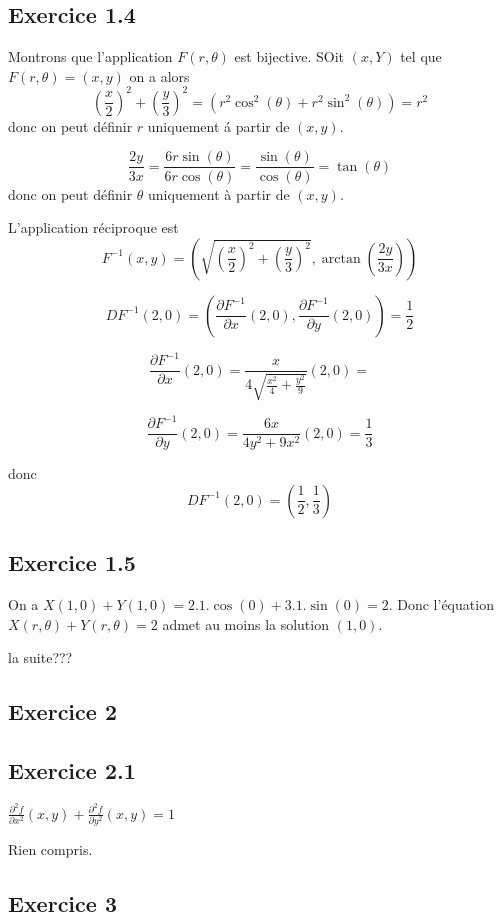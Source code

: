 \documentclass[]{book}
\theoremstyle{definition}
\begin{document}
\subsection*{Exercice 1.4}

Montrons que l'application $F(r,\theta)$ est bijective. SOit $(x,Y)$ tel que $F(r,\theta) = (x,y)$ on a alors 
$$
\left(\frac{x}{2}\right)^2+\left(\frac{y}{3}\right)^2 = (r^2\cos^2(\theta) + r^2\sin^2(\theta)) = r^2 
$$
donc on peut d\'efinir $r$ uniquement \'a partir de $(x,y)$. 


$$
\frac{2y}{3x} = \frac{6r\sin(\theta)}{6r\cos(\theta)} = \frac{\sin(\theta)}{\cos(\theta)} = \tan(\theta)
$$
donc on peut d\'efinir $\theta$ uniquement \`a partir de $(x,y)$. 

L'application r\'eciproque est 
$$
F^{-1}(x,y) = \left(\sqrt{\left(\frac{x}{2}\right)^2+\left(\frac{y}{3}\right)^2}, \arctan \left(\frac{2y}{3x}\right) \right)
$$

$$
    DF^{-1}(2,0) = \left( \frac{\partial F^{-1}}{\partial x}(2,0),  \frac{\partial F^{-1}}{\partial y}(2,0)\right) = \frac{1}{2}
$$

$$
\frac{\partial F^{-1}}{\partial x}(2,0) = \frac{x}{4\sqrt{ \frac{x^2}{4}+\frac{y^2}{9}}}(2,0) = 
$$

$$
\frac{\partial F^{-1}}{\partial y}(2,0) = \frac{6x}{4y^2+9x^2}(2,0) = \frac{1}{3}
$$

donc
$$
DF^{-1}(2,0) = \left(\frac{1}{2}, \frac{1}{3}\right)
$$


\subsection*{Exercice 1.5}
On a $X(1,0) + Y(1,0) = 2.1.\cos(0) + 3.1.\sin(0) = 2$. Donc l'\'equation $X(r,\theta)+Y(r,\theta) = 2$ admet au moins la solution $(1,0)$.

la suite???


\subsection*{Exercice 2}
\subsection*{Exercice 2.1}

$\frac{\partial^2 f}{\partial x^2}(x,y) +  \frac{\partial^2 f}{\partial y^2}(x,y) = 1$


Rien compris.

\subsection*{Exercice 3}
\end{document}
